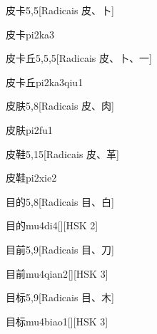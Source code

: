 \begin{entry}{皮卡}{5,5}[Radicais ⽪、⼘]
  \begin{phonetics}{皮卡}{pi2ka3}
  \end{phonetics}
\end{entry}

\begin{entry}{皮卡丘}{5,5,5}[Radicais ⽪、⼘、⼀]
  \begin{phonetics}{皮卡丘}{pi2ka3qiu1}
  \end{phonetics}
\end{entry}

\begin{entry}{皮肤}{5,8}[Radicais ⽪、⾁]
  \begin{phonetics}{皮肤}{pi2fu1}
  \end{phonetics}
\end{entry}

\begin{entry}{皮鞋}{5,15}[Radicais ⽪、⾰]
  \begin{phonetics}{皮鞋}{pi2xie2}
  \end{phonetics}
\end{entry}

\begin{entry}{目的}{5,8}[Radicais ⽬、⽩]
  \begin{phonetics}{目的}{mu4di4}[][HSK 2]
  \end{phonetics}
\end{entry}

\begin{entry}{目前}{5,9}[Radicais ⽬、⼑]
  \begin{phonetics}{目前}{mu4qian2}[][HSK 3]
  \end{phonetics}
\end{entry}

\begin{entry}{目标}{5,9}[Radicais ⽬、⽊]
  \begin{phonetics}{目标}{mu4biao1}[][HSK 3]
  \end{phonetics}
\end{entry}


